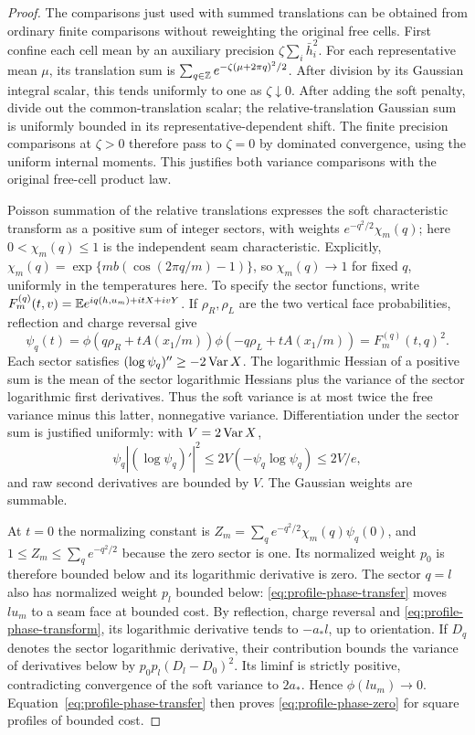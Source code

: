 \begin{proof}
The comparisons just used with summed translations can be obtained
from ordinary finite comparisons without reweighting the original
free cells. First confine each cell mean by an auxiliary precision
$\zeta\sum_i\bar h_i^2$. For each representative mean $\mu$,
its translation sum is
$\sum_{q\in\mathbb Z}e^{-\zeta(\mu+2\pi q)^2/2}$.
After division by its Gaussian integral scalar, this tends uniformly
to one as $\zeta\downarrow0$. After adding the soft penalty, divide
out the common-translation scalar; the relative-translation Gaussian
sum is uniformly bounded in its representative-dependent shift.
The finite precision comparisons at $\zeta>0$ therefore pass to
$\zeta=0$ by dominated convergence, using the uniform internal
moments. This justifies both variance comparisons with the original
free-cell product law.

Poisson summation of the relative translations expresses the soft
characteristic transform as a positive sum of integer sectors, with
weights $e^{-q^2/2}\chi_m(q)$; here $0<\chi_m(q)\le1$ is the
independent seam characteristic. Explicitly,
$\chi_m(q)=\exp\{mb(\cos(2\pi q/m)-1)\}$, so
$\chi_m(q)\to1$ for fixed $q$, uniformly in the temperatures here.
To specify the sector functions, write
$F_m^{(q)}(t,v)=\mathbb E e^{iq(h,u_m)+itX+ivY}$. If $\rho_R,\rho_L$
are the two vertical face probabilities, reflection and charge
reversal give
\[
 \psi_q(t)=\phi(q\rho_R+tA(x_1/m))
               \phi(-q\rho_L+tA(x_1/m))
           =F_m^{(q)}(t,q)^2.
\]
Each sector satisfies $(\log\psi_q)''\ge-2\operatorname{Var} X$. The logarithmic Hessian of a positive
sum is the mean of the sector logarithmic Hessians plus the variance
of the sector logarithmic first derivatives. Thus the soft variance
is at most twice the free variance minus this latter, nonnegative
variance. Differentiation under the sector sum is justified uniformly:
with $V=2\operatorname{Var} X$,
\[
 \psi_q| (\log\psi_q)'|^2
       \le2V(-\psi_q\log\psi_q)\le2V/e,
\]
and raw second derivatives are bounded by $V$. The Gaussian weights
are summable.

At $t=0$ the normalizing constant is
$Z_m=\sum_qe^{-q^2/2}\chi_m(q)\psi_q(0)$, and
$1\le Z_m\le\sum_qe^{-q^2/2}$ because the zero sector is one.
Its normalized weight $p_0$ is therefore bounded below and its
logarithmic derivative is zero. The sector $q=l$ also has normalized
weight $p_l$ bounded below: \eqref{eq:profile-phase-transfer} moves $lu_m$ to a
seam face at bounded cost. By reflection, charge reversal and
\eqref{eq:profile-phase-transform}, its logarithmic derivative tends
to $-a_*l$, up to orientation. If $D_q$ denotes the sector
logarithmic derivative, their contribution bounds the variance of
derivatives below by $p_0p_l(D_l-D_0)^2$. Its liminf is strictly
positive, contradicting convergence of the
soft variance to $2a_*$. Hence $\phi(lu_m)\to0$.
Equation~\eqref{eq:profile-phase-transfer} then proves
\eqref{eq:profile-phase-zero} for square profiles of bounded cost.


\end{proof}

